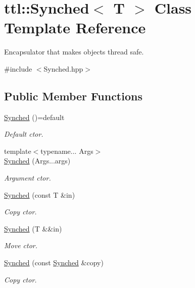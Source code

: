 \hypertarget{classttl_1_1_synched}{\section{ttl\-:\-:Synched$<$ T $>$ Class Template Reference}
\label{classttl_1_1_synched}
}


Encapsulator that makes objects thread safe.  




{\ttfamily \#include $<$Synched.\-hpp$>$}

\subsection*{Public Member Functions}
\begin{DoxyCompactItemize}
\item 
\hyperlink{classttl_1_1_synched_afb711c74345c0fe671313e6df9a38fb1}{Synched} ()=default
\begin{DoxyCompactList}\small\item\em Default ctor. \end{DoxyCompactList}\item 
{\footnotesize template$<$typename... Args$>$ }\\\hyperlink{classttl_1_1_synched_a3682a5a65a6871126e0fefbd6b335482}{Synched} (Args...\-args)
\begin{DoxyCompactList}\small\item\em Argument ctor. \end{DoxyCompactList}\item 
\hyperlink{classttl_1_1_synched_aa0699d5888f20a1df6e53303700f40a0}{Synched} (const T \&in)
\begin{DoxyCompactList}\small\item\em Copy ctor. \end{DoxyCompactList}\item 
\hyperlink{classttl_1_1_synched_af2abfc5aa8f9246420947816d06ba26f}{Synched} (T \&\&in)
\begin{DoxyCompactList}\small\item\em Move ctor. \end{DoxyCompactList}\item 
\hyperlink{classttl_1_1_synched_a256002a4a8d0f0b4fe75c7a8b2902698}{Synched} (const \hyperlink{classttl_1_1_synched}{Synched} \&copy)
\begin{DoxyCompactList}\small\item\em Copy ctor. \end{DoxyCompactList}\item 

\end{DoxyCompactItemize}
